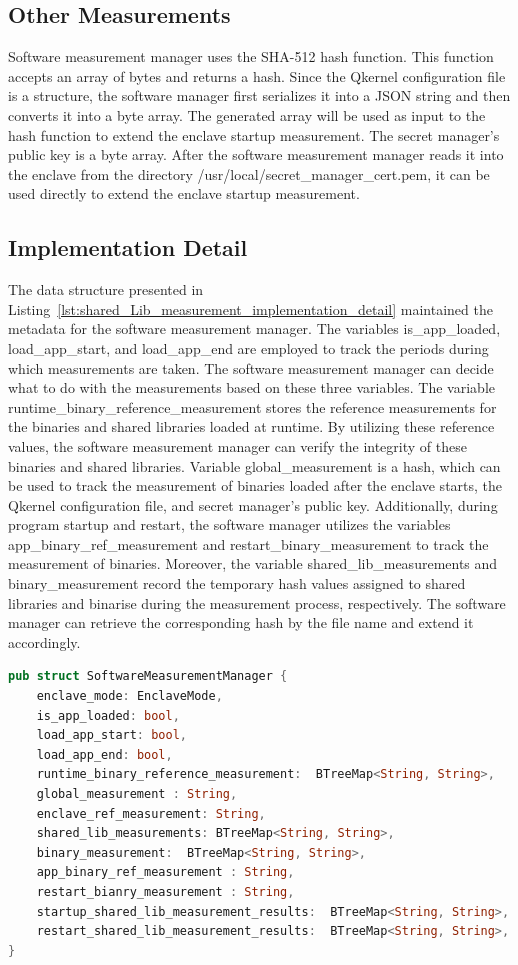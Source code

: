 \subsection{Other Measurements}
Software measurement manager uses the SHA-512 hash function. This function accepts an array of bytes and returns a hash. Since the Qkernel configuration file is a structure, the software manager first serializes it into a JSON string and then converts it into a byte array. The generated array will 
be used as input to the hash function to extend the enclave startup measurement. The secret manager's public key is a byte array. After the software measurement manager reads it into the enclave from the directory /usr/local/secret\_manager\_cert.pem, it can be used directly to extend the enclave 
startup measurement.

\subsection{Implementation Detail}
The data structure presented in Listing~\ref{lst:shared_Lib_measurement_implementation_detail} maintained the metadata for the software measurement manager. The variables is\_app\_loaded, load\_app\_start, and load\_app\_end are employed to track the periods during which measurements are taken. 
The software measurement manager can decide what to do with the measurements based on these three variables. The variable runtime\_binary\_reference\_measurement stores the reference measurements for the binaries and shared libraries loaded at runtime. By utilizing these reference values, the software 
measurement manager can verify the integrity of these binaries and shared libraries. Variable global\_measurement is a hash, which can be used to track the measurement of binaries loaded after the enclave starts, the Qkernel configuration file, and secret manager’s public key.
Additionally, during program startup and restart, the software manager utilizes the variables app\_binary\_ref\_measurement and restart\_binary\_measurement to track the measurement of binaries. Moreover, the variable shared\_lib\_measurements and binary\_measurement record the temporary hash values 
assigned to shared libraries and binarise during the measurement process, respectively. The software manager can retrieve the corresponding hash by the file name and extend it accordingly.


\begin{lstlisting}[language=rust, caption= Interface for accessing the file type secrets, label={lst:shared_Lib_measurement_implementation_detail}]
pub struct SoftwareMeasurementManager {
    enclave_mode: EnclaveMode,
    is_app_loaded: bool,
    load_app_start: bool,
    load_app_end: bool,
    runtime_binary_reference_measurement:  BTreeMap<String, String>,
    global_measurement : String,
    enclave_ref_measurement: String,
    shared_lib_measurements: BTreeMap<String, String>,
    binary_measurement:  BTreeMap<String, String>,
    app_binary_ref_measurement : String,
    restart_bianry_measurement : String,
    startup_shared_lib_measurement_results:  BTreeMap<String, String>,
    restart_shared_lib_measurement_results:  BTreeMap<String, String>,
}
\end{lstlisting}

